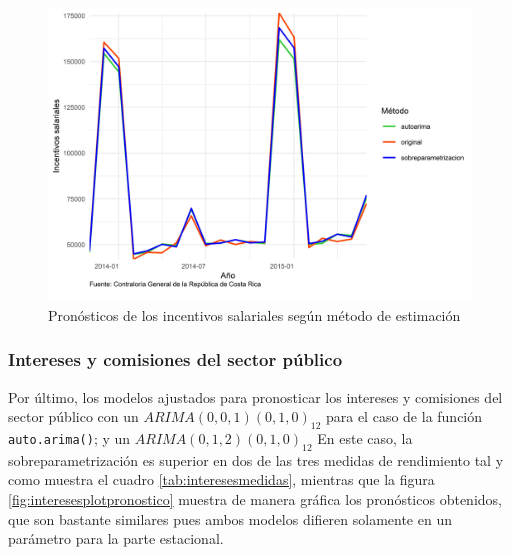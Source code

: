 \documentclass[
]{article}
\begin{document}
\begin{table}[!h]

\caption{\label{tab:unnamed-chunk-21}\label{tab:incentivosmedidas}Medidas de rendimiento según método de estimación para los incentivos salariales}
\centering
{}
\end{table}

\begin{figure}[!h]
\includegraphics[width=1\linewidth,height=1\textheight]{Tesis_files/figure-latex/incentivosplotpronostico-1} \caption{Pronósticos de los incentivos salariales según método de estimación}\label{fig:incentivosplotpronostico}
\end{figure}

\subsubsection{Intereses y comisiones del sector público}

Por último, los modelos ajustados para pronosticar los intereses y
comisiones del sector público con un \(ARIMA(0,0,1)(0,1,0)_{12}\) para
el caso de la función \texttt{auto.arima()}; y un
\(ARIMA(0,1,2)(0,1,0)_{12}\) En este caso, la sobreparametrización es
superior en dos de las tres medidas de rendimiento tal y como muestra el
cuadro \ref{tab:interesesmedidas}, mientras que la figura
\ref{fig:interesesplotpronostico} muestra de manera gráfica los
pronósticos obtenidos, que son bastante similares pues ambos modelos
difieren solamente en un parámetro para la parte estacional.
\end{document}
